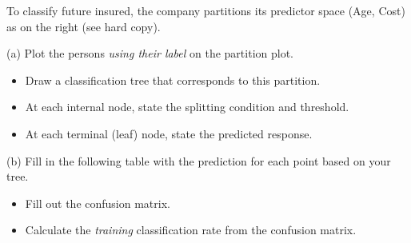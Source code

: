 \documentclass[
  letterpaper,
  DIV=11,
  numbers=noendperiod]{scrartcl}
\providecommand{\tightlist}{%
  \setlength{\itemsep}{0pt}\setlength{\parskip}{0pt}}\usepackage{longtable,booktabs,array}
\begin{document}
To classify future insured, the company partitions its predictor space
(Age, Cost) as on the right (see hard copy).

(a) Plot the persons \emph{using their label} on the partition plot.

\begin{itemize}
\tightlist
\item
  Draw a classification tree that corresponds to this partition.
\item
  At each internal node, state the splitting condition and threshold.
\item
  At each terminal (leaf) node, state the predicted response.
\end{itemize}

(b) Fill in the following table with the prediction for each point based
on your tree.

\begin{itemize}
\tightlist
\item
  Fill out the confusion matrix.
\item
  Calculate the \emph{training} classification rate from the confusion
  matrix.
\end{itemize}
\end{document}
